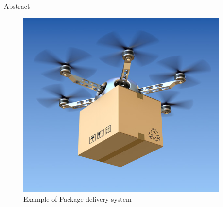 \documentclass[final]{beamer}
\newlength{\sepwid}
\newlength{\onecolwid}
\begin{document}
\setlength{\belowcaptionskip}{2ex} %
\setlength\belowdisplayshortskip{2ex} %



\begin{frame}[t] %

\begin{columns}[t] %

\begin{column}{\sepwid}\end{column} %

\begin{column}{\onecolwid} %


\begin{block}{Abstract}
{\small\par}

\end{block}



\begin{figure}
\includegraphics[width=0.8\linewidth]{images/delivery-drone.jpg}
\caption{Example of Package delivery system}
\end{figure}




\end{column}
\end{columns}
\end{frame}
\end{document}
